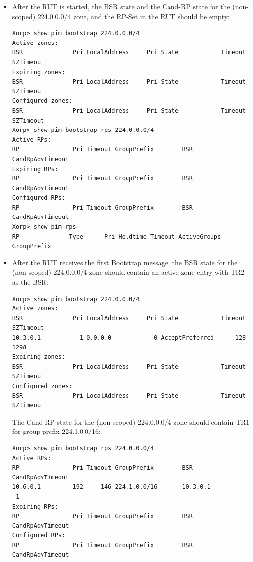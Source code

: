 \documentclass[11pt]{report}
\begin{document}

\begin{itemize}

  \item After the RUT is started, the BSR state and the Cand-RP state for the
 (non-scoped) 224.0.0.0/4 zone, and the RP-Set in the RUT should be empty:

\begin{verbatim}
Xorp> show pim bootstrap 224.0.0.0/4
Active zones:
BSR              Pri LocalAddress     Pri State            Timeout SZTimeout
Expiring zones:
BSR              Pri LocalAddress     Pri State            Timeout SZTimeout
Configured zones:
BSR              Pri LocalAddress     Pri State            Timeout SZTimeout
Xorp> show pim bootstrap rps 224.0.0.0/4
Active RPs:
RP               Pri Timeout GroupPrefix        BSR         CandRpAdvTimeout
Expiring RPs:
RP               Pri Timeout GroupPrefix        BSR         CandRpAdvTimeout
Configured RPs:
RP               Pri Timeout GroupPrefix        BSR         CandRpAdvTimeout
Xorp> show pim rps 
RP              Type      Pri Holdtime Timeout ActiveGroups GroupPrefix       
\end{verbatim}

  \item After the RUT receives the first Bootstrap message, the BSR state for
  the (non-scoped) 224.0.0.0/4 zone should contain an active zone entry with
  TR2 as the BSR:

\begin{verbatim}
Xorp> show pim bootstrap 224.0.0.0/4
Active zones:
BSR              Pri LocalAddress     Pri State            Timeout SZTimeout
10.3.0.1           1 0.0.0.0            0 AcceptPreferred      128      1298
Expiring zones:
BSR              Pri LocalAddress     Pri State            Timeout SZTimeout
Configured zones:
BSR              Pri LocalAddress     Pri State            Timeout SZTimeout
\end{verbatim}

  The Cand-RP state for the (non-scoped) 224.0.0.0/4 zone should contain TR1
  for group prefix 224.1.0.0/16:

\begin{verbatim}
Xorp> show pim bootstrap rps 224.0.0.0/4
Active RPs:
RP               Pri Timeout GroupPrefix        BSR         CandRpAdvTimeout
10.6.0.1         192     146 224.1.0.0/16       10.3.0.1                  -1
Expiring RPs:
RP               Pri Timeout GroupPrefix        BSR         CandRpAdvTimeout
Configured RPs:
RP               Pri Timeout GroupPrefix        BSR         CandRpAdvTimeout
\end{verbatim}


\end{itemize}
\end{document}
